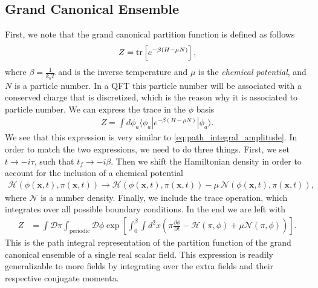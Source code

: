         \subsection{Grand Canonical Ensemble} \label{GCE_sec}
        First, we note that the grand canonical partition function is defined as follows
        \begin{align}
            Z= {\rm tr} \left[e^{-\beta \left( H - \mu N \right)}\right],
        \end{align}
        where $\beta = \frac{1}{k_b T}$ and is the inverse temperature and $\mu$ is the \textit{chemical potential}, and $N$ is a particle number. In a QFT this particle number will be associated with a conserved charge that is discretized, which is the reason why it is associated to particle number. We can express the trace in the $\phi$ basis
        \begin{align}
            Z= \int d \phi_a \langle \phi_a | e^{-\beta \left( H - \mu N \right)} | \phi_a \rangle.
        \end{align}
        We see that this expression is very similar to \ref{eq:path_integral_amplitude}. In order to match the two expressions, we need to do three things. First, we set $t \rightarrow -i \tau$, such that $t_f \rightarrow -i \beta$. Then we shift the Hamiltonian density in order to account for the inclusion of a chemical potential
        \begin{align}
            \mathcal{H} \left(\phi(\bm{x},t),\pi (\bm{x},t) \right) \rightarrow \mathcal{H}\left(\phi(\bm{x},t),\pi (\bm{x},t) \right) - \mu \ \mathcal{N}\left(\phi(\bm{x},t),\pi (\bm{x},t) \right),
        \end{align}
        where $\mathcal{N}$ is a number density. Finally, we include the trace operation, which integrates over all possible boundary conditions. In the end we are left with
        \begin{align}
            Z &= \int \mathcal{D} \pi \int_{\text{periodic}} \mathcal{D} \phi \exp \left[ \int_0^{\beta} \int d^2x \left(\pi \frac{\partial \phi}{\partial t} - \mathcal{H}(\pi, \phi) + \mu \mathcal{N}(\pi, \phi) \right) \right] \label{eq:partition_function}.
        \end{align}
This is the path integral representation of the partition function of the grand canonical ensemble of a single real scalar field. This expression is readily generalizable to more fields by integrating over the extra fields and their respective conjugate momenta.

